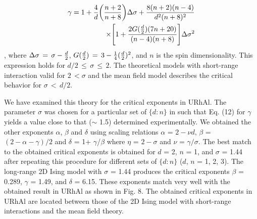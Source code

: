 \documentclass[twocolumn,showpacs,preprintnumbers,amsmath,amssymb]{revtex4}
\begin{document}
  \begin{eqnarray}
{\gamma} = 1+{4\over d}{\biggl(}{{{n+2}\over {n+8}}}{\biggl)}{{\Delta}{\sigma}}+{{8(n+2)(n-4)}\over {{d^2}{(n+8)^2}}}\nonumber\\
{\times}{\Biggl[}1+{{2G({d\over 2})(7n+20)}\over {{(n-4)(n+8)}}}{\Biggl]}{{\Delta}{\sigma}^2}
 \end{eqnarray} 
, where ${{\Delta}{\sigma}}{\,}={\,}{\sigma}-{d\over 2}$, $G({d\over 2}){\,}={\,}3-{1\over 4}({d\over 2})^2$, and $n$ is the spin dimensionality. This expression holds for ${d/2}{\,}{\le}{\,}{\sigma}{\,}{\le}{\,}2$. The theoretical models with short-range interaction valid for $2{\,}{<}{\sigma}$ and the mean field model describes the critical behavior for ${\sigma}{\,}{<}{\,}{d/2}$.

 We have examined this theory for the critical exponents in URhAl. The parameter $\sigma$ was chosen for a particular set of ${\{}d:n{\}}$ in such that Eq. (12) for $\gamma$ yields a value close to that  ($\sim$ 1.5) determined experimentally. We obtained the other exponents $\alpha$, $\beta$ and $\delta$ using scaling relations $\alpha$ = $2-{\nu}d$, $\beta$ = $(2-{\alpha}-{\gamma})/2$ and $\delta$ = 1+ $\gamma$/$\beta$ where $\eta$ = $2-{\sigma}$ and $\nu$ = ${\gamma}/{\sigma}$. The best match to the obtained critical exponents is obtained for $d$ = 2, $n$ = 1, and $\sigma$ = 1.44 after repeating this procedure for different sets of ${\{}d:n{\}}$ ($d$, $n$ = 1, 2, 3). The long-range 2D Ising model with $\sigma$ = 1.44 produces the critical exponents $\beta$ = 0.289, $\gamma$ = 1.49, and $\delta$ = 6.15. These exponents match very well with the obtained result in URhAl as shown in Fig. 8. The obtained critical exponents in URhAl are located between those of the 2D Ising model with short-range interactions and the mean field theory.
\end{document}
